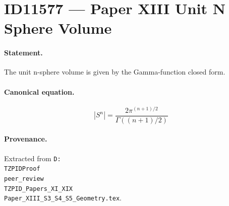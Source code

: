 \section*{ID11577 --- Paper XIII Unit N Sphere Volume}

\paragraph{Statement.}
The unit n-sphere volume is given by the Gamma-function closed form.

\paragraph{Canonical equation.}
\[
|S^n|=\frac{2\pi^{(n+1)/2}}{\Gamma((n+1)/2)}
\]

\paragraph{Provenance.}
Extracted from \texttt{D:\\TZPIDProof\\peer\_review\\TZPID\_Papers\_XI\_XIX\\Paper\_XIII\_S3\_S4\_S5\_Geometry.tex}.
